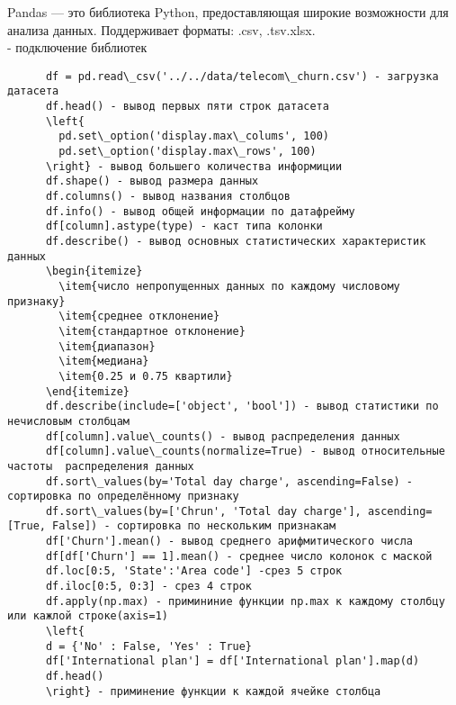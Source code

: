 \documentclass{article}
\begin{document}
\lstset{language=Python}

Pandas — это библиотека Python, предоставляющая широкие возможности для анализа данных. Поддерживает форматы: .csv, .tsv.xlsx.\\
  - подключение библиотек
   \begin{lstlisting}
      df = pd.read\_csv('../../data/telecom\_churn.csv') - загрузка датасета
      df.head() - вывод первых пяти строк датасета
      \left{
        pd.set\_option('display.max\_colums', 100)
        pd.set\_option('display.max\_rows', 100)
      \right} - вывод большего количества информиции
      df.shape() - вывод размера данных
      df.columns() - вывод названия столбцов
      df.info() - вывод общей информации по датафрейму
      df[column].astype(type) - каст типа колонки
      df.describe() - вывод основных статистических характеристик данных
      \begin{itemize}
        \item{число непропущенных данных по каждому числовому признаку}
        \item{среднее отклонение}
        \item{стандартное отклонение}
        \item{диапазон}
        \item{медиана}
        \item{0.25 и 0.75 квартили}
      \end{itemize}
      df.describe(include=['object', 'bool']) - вывод статистики по нечисловым столбцам
      df[column].value\_counts() - вывод распределения данных
      df[column].value\_counts(normalize=True) - вывод относительные частоты  распределения данных 
      df.sort\_values(by='Total day charge', ascending=False) - сортировка по определённому признаку
      df.sort\_values(by=['Chrun', 'Total day charge'], ascending=[True, False]) - сортировка по нескольким признакам
      df['Churn'].mean() - вывод среднего арифмитического числа
      df[df['Churn'] == 1].mean() - среднее число колонок с маской
      df.loc[0:5, 'State':'Area code'] -срез 5 строк
      df.iloc[0:5, 0:3] - срез 4 строк
      df.apply(np.max) - примининие функции np.max к каждому столбцу или кажлой строке(axis=1)
      \left{
      d = {'No' : False, 'Yes' : True}
      df['International plan'] = df['International plan'].map(d)
      df.head()
      \right} - приминение функции к каждой ячейке столбца

\end{lstlisting}
\end{document}
